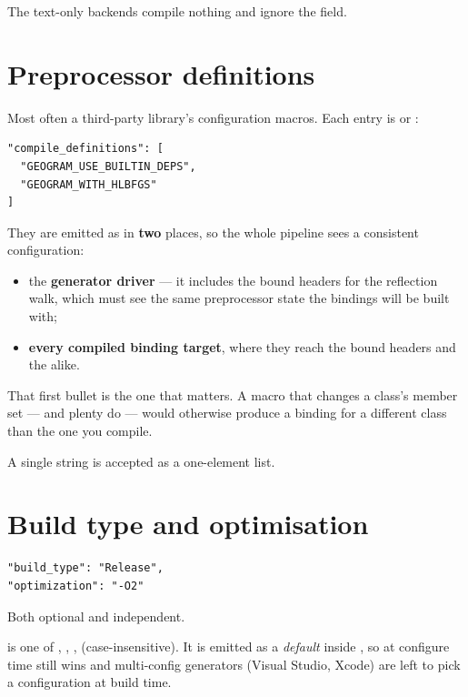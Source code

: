 The text-only backends compile nothing and ignore the field.

\section{Preprocessor definitions}

Most often a third-party library's configuration macros. Each entry is
 or :

\begin{lstlisting}[style=json]
"compile_definitions": [
  "GEOGRAM_USE_BUILTIN_DEPS",
  "GEOGRAM_WITH_HLBFGS"
]
\end{lstlisting}

They are emitted as 
in \textbf{two} places, so the whole pipeline sees a consistent configuration:

\begin{itemize}
  \item the \textbf{generator driver} --- it includes the bound headers for the
    reflection walk, which must see the same preprocessor state the bindings
    will be built with;
  \item \textbf{every compiled binding target}, where they reach the bound
    headers and the  alike.
\end{itemize}

That first bullet is the one that matters. A macro that changes a class's member
set --- and plenty do --- would otherwise produce a binding for a different
class than the one you compile.

A single string is accepted as a one-element list.

\section{Build type and optimisation}
\label{sec:buildtype}

\begin{lstlisting}[style=json]
"build_type": "Release",
"optimization": "-O2"
\end{lstlisting}

Both optional and independent.

 is one of , ,
,  (case-insensitive). It is emitted as a
\emph{default} inside
, so
 at configure time still wins and multi-config
generators (Visual Studio, Xcode) are left to pick a configuration at build
time.

